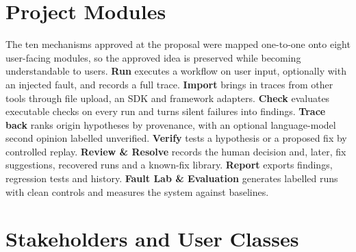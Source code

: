 \section{Project Modules}

The ten mechanisms approved at the proposal were mapped one-to-one onto eight user-facing modules, so the approved idea is preserved while becoming understandable to users. \textbf{Run} executes a workflow on user input, optionally with an injected fault, and records a full trace. \textbf{Import} brings in traces from other tools through file upload, an SDK and framework adapters. \textbf{Check} evaluates executable checks on every run and turns silent failures into findings. \textbf{Trace back} ranks origin hypotheses by provenance, with an optional language-model second opinion labelled unverified. \textbf{Verify} tests a hypothesis or a proposed fix by controlled replay. \textbf{Review \& Resolve} records the human decision and, later, fix suggestions, recovered runs and a known-fix library. \textbf{Report} exports findings, regression tests and history. \textbf{Fault Lab \& Evaluation} generates labelled runs with clean controls and measures the system against baselines.

\section{Stakeholders and User Classes}

